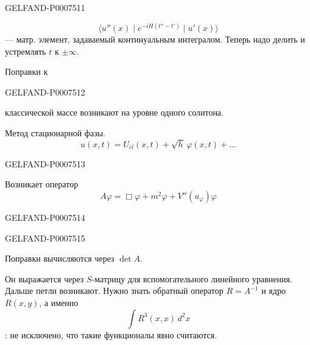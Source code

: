 \begin{GelfandAdjacentEvidence}{GELFAND-P000751}{1}

\begin{equation*}
\langle u''(x)\mid e^{-iH(t''-t')}\mid u'(x)\rangle
\tag{38}
\end{equation*}
--- матр. элемент, задаваемый континуальным интегралом. Теперь надо делить и устремлять \(t\) к \(\pm\infty\).

Поправки к
\end{GelfandAdjacentEvidence}
\begin{GelfandAdjacentEvidence}{GELFAND-P000751}{2}

классической массе возникают на уровне одного солитона.


Метод стационарной фазы.
\begin{equation*}
u(x,t)=U_{cl}(x,t)+\sqrt h\,\varphi(x,t)+\ldots
\tag{39}
\end{equation*}
\end{GelfandAdjacentEvidence}
\begin{GelfandAdjacentEvidence}{GELFAND-P000751}{3}

Возникает оператор
\begin{equation*}
A\varphi=\Box\varphi+m^2\varphi+V''(u_\varphi)\varphi
\tag{40}
\end{equation*}
\end{GelfandAdjacentEvidence}
\begin{GelfandAdjacentEvidence}{GELFAND-P000751}{4}

\end{GelfandAdjacentEvidence}
\begin{GelfandAdjacentEvidence}{GELFAND-P000751}{5}

Поправки вычисляются через \(\det A\).

Он выражается через \(S\)-матрицу для вспомогательного линейного уравнения. Дальше петли возникают.
Нужно знать обратный оператор \(R=A^{-1}\) и ядро \underline{\(R(x,y)\)}, а именно
\begin{equation*}
\int R^3(x,x)\,d^2x
\tag{41}
\end{equation*}
: не исключено, что такие функционалы явно считаются.
\end{GelfandAdjacentEvidence}
